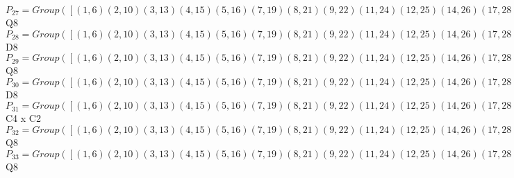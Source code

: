 \documentclass[varwidth=\maxdimen,border=10]{standalone}
\begin{document}
\begin{tabular}
$P_{27} = Group( [ ( 1, 6)( 2,10)( 3,13)( 4,15)( 5,16)( 7,19)( 8,21)( 9,22)(11,24)(12,25)(14,26)(17,28)(18,29)(20,30)(23,31)(27,32), ( 1,22, 6, 9)( 2,16,10, 5)( 3,18,13,29)( 4,30,15,20)( 7,12,19,25)( 8,26,21,14)(11,27,24,32)(17,23,28,31), ( 1, 8, 6,21)( 2, 4,10,15)( 3,28,13,17)( 5,30,16,20)( 7,24,19,11)( 9,26,22,14)(12,27,25,32)(18,23,29,31) ] )\cong$ Q8\ \\
$P_{28} = Group( [ ( 1, 6)( 2,10)( 3,13)( 4,15)( 5,16)( 7,19)( 8,21)( 9,22)(11,24)(12,25)(14,26)(17,28)(18,29)(20,30)(23,31)(27,32), ( 1,14, 6,26)( 2,20,10,30)( 3,23,13,31)( 4,16,15, 5)( 7,27,19,32)( 8,22,21, 9)(11,25,24,12)(17,29,28,18), ( 1, 2)( 3,19)( 4, 8)( 5,22)( 6,10)( 7,13)( 9,16)(11,28)(12,18)(14,30)(15,21)(17,24)(20,26)(23,27)(25,29)(31,32) ] )\cong$ D8\ \\
$P_{29} = Group( [ ( 1, 6)( 2,10)( 3,13)( 4,15)( 5,16)( 7,19)( 8,21)( 9,22)(11,24)(12,25)(14,26)(17,28)(18,29)(20,30)(23,31)(27,32), ( 1,14, 6,26)( 2,20,10,30)( 3,23,13,31)( 4,16,15, 5)( 7,27,19,32)( 8,22,21, 9)(11,25,24,12)(17,29,28,18), ( 1, 3, 6,13)( 2, 7,10,19)( 4,24,15,11)( 5,12,16,25)( 8,28,21,17)( 9,18,22,29)(14,31,26,23)(20,32,30,27) ] )\cong$ Q8\ \\
$P_{30} = Group( [ ( 1, 6)( 2,10)( 3,13)( 4,15)( 5,16)( 7,19)( 8,21)( 9,22)(11,24)(12,25)(14,26)(17,28)(18,29)(20,30)(23,31)(27,32), ( 1, 3, 6,13)( 2, 7,10,19)( 4,24,15,11)( 5,12,16,25)( 8,28,21,17)( 9,18,22,29)(14,31,26,23)(20,32,30,27), ( 1, 2)( 3,19)( 4, 8)( 5,22)( 6,10)( 7,13)( 9,16)(11,28)(12,18)(14,30)(15,21)(17,24)(20,26)(23,27)(25,29)(31,32) ] )\cong$ D8\ \\
$P_{31} = Group( [ ( 1, 6)( 2,10)( 3,13)( 4,15)( 5,16)( 7,19)( 8,21)( 9,22)(11,24)(12,25)(14,26)(17,28)(18,29)(20,30)(23,31)(27,32), ( 1, 5)( 2, 9)( 3,12)( 4,14)( 6,16)( 7,18)( 8,20)(10,22)(11,23)(13,25)(15,26)(17,27)(19,29)(21,30)(24,31)(28,32), ( 1,24, 6,11)( 2,28,10,17)( 3, 4,13,15)( 5,31,16,23)( 7, 8,19,21)( 9,32,22,27)(12,14,25,26)(18,20,29,30) ] )\cong$ C4 x C2\ \\
$P_{32} = Group( [ ( 1, 6)( 2,10)( 3,13)( 4,15)( 5,16)( 7,19)( 8,21)( 9,22)(11,24)(12,25)(14,26)(17,28)(18,29)(20,30)(23,31)(27,32), ( 1,12, 6,25)( 2,18,10,29)( 3,16,13, 5)( 4,31,15,23)( 7,22,19, 9)( 8,32,21,27)(11,14,24,26)(17,20,28,30), ( 1, 4, 6,15)( 2, 8,10,21)( 3,11,13,24)( 5,14,16,26)( 7,17,19,28)( 9,20,22,30)(12,23,25,31)(18,27,29,32) ] )\cong$ Q8\ \\
$P_{33} = Group( [ ( 1, 6)( 2,10)( 3,13)( 4,15)( 5,16)( 7,19)( 8,21)( 9,22)(11,24)(12,25)(14,26)(17,28)(18,29)(20,30)(23,31)(27,32), ( 1,22, 6, 9)( 2,16,10, 5)( 3,18,13,29)( 4,30,15,20)( 7,12,19,25)( 8,26,21,14)(11,27,24,32)(17,23,28,31), ( 1, 3, 6,13)( 2, 7,10,19)( 4,24,15,11)( 5,12,16,25)( 8,28,21,17)( 9,18,22,29)(14,31,26,23)(20,32,30,27) ] )\cong$ Q8\ \\

\end{tabular}
\end{document}
